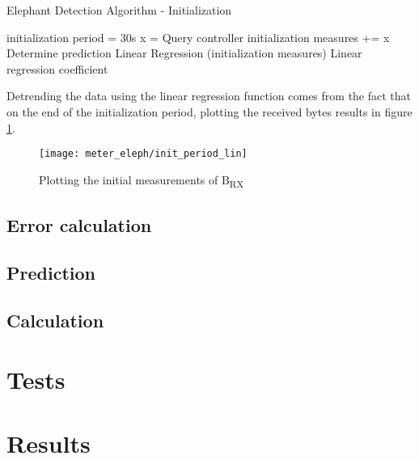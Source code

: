 \begin{algorithm}[H]
    \caption{Elephant Detection Algorithm - Initialization} \label{alg:high_level}
    \begin{algorithmic}[1]
            \State initialization period = 30s
                \State x = Query controller
                \State initialization measures += x
                \State Determine prediction
            \EndWhile
            \State Linear Regression (initialization measures)
        \State \Return Linear regression coefficient
    \end{algorithmic}
\end{algorithm}

\par Detrending the data using the linear regression function comes from the fact that on the end of the initialization period, plotting the received bytes results in figure \ref{fig:init_plot}.

\begin{figure} 
    \centering
    \texttt{[image: meter\_eleph/init\_period\_lin]}
    \caption {Plotting the initial measurements of B\textsubscript{RX}}
    \label{fig:init_plot}
\end{figure} 

\subsection{Error calculation}

\subsection{Prediction}

\subsection{Calculation}


\section {Tests}
\section {Results}

